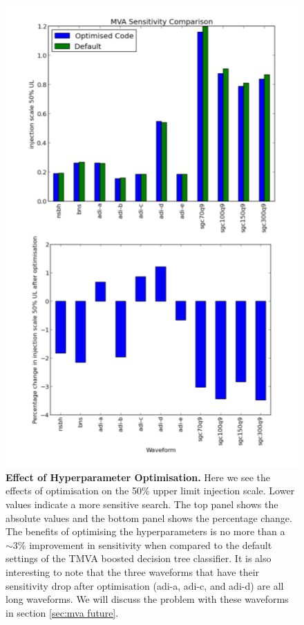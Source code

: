 \documentclass[11pt]{cuthesis}
\begin{document}
\begin{figure} %
\begin{center}
\includegraphics[width=0.8\linewidth]{opt_comparison.png}
\end{center}
\caption{\textbf{Effect of Hyperparameter Optimisation.} Here we see the effects of optimisation on the 50\% upper limit injection scale. Lower values indicate a more sensitive search. The top panel shows the absolute values and the bottom panel shows the percentage change. The benefits of optimising the hyperparameters is no more than a $\sim3\%$ improvement in sensitivity when compared to the default settings of the TMVA boosted decision tree classifier. It is also interesting to note that the three waveforms that have their sensitivity drop after optimisation (adi-a, adi-c, and adi-d) are all long waveforms. We will discuss the problem with these waveforms in section \ref{sec:mva future}. }
\label{fig:opt compare}
\end{figure}
\end{document}
